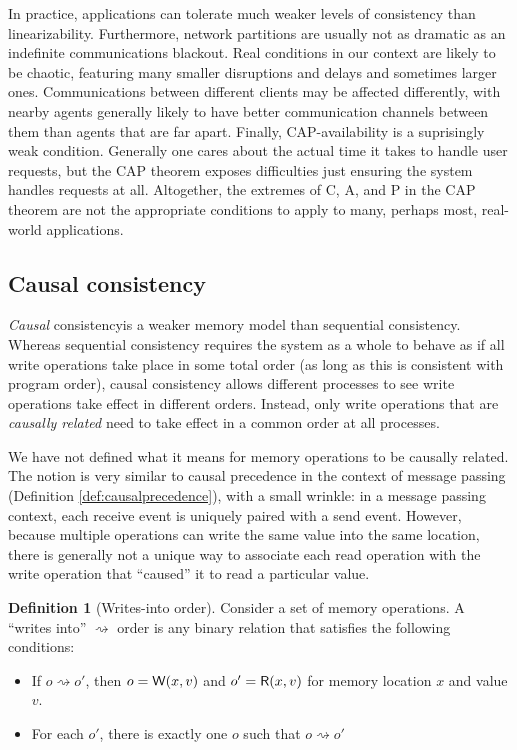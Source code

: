 \documentclass[]             %
{NASA}                       %
\theoremstyle{definition}
\newtheorem{definition}{Definition}[section]
\begin{document}
In practice, applications can tolerate much weaker levels of
consistency than linearizability. Furthermore, network partitions are
usually not as dramatic as an indefinite communications blackout. Real
conditions in our context are likely to be chaotic, featuring many
smaller disruptions and delays and sometimes larger
ones. Communications between different clients may be affected
differently, with nearby agents generally likely to have better
communication channels between them than agents that are far
apart. Finally, CAP-availability is a suprisingly weak condition.
Generally one cares about the actual time it takes to handle user
requests, but the CAP theorem exposes difficulties just ensuring the
system handles requests at all. Altogether, the extremes of C, A, and
P in the CAP theorem are not the appropriate conditions to apply to
many, perhaps most, real-world applications.

\subsection{Causal consistency}
\label{ssec:causal-consistency}

\emph{Causal} consistency\citationneeded is a weaker memory model than
sequential consistency. Whereas sequential consistency requires the
system as a whole to behave as if all write operations take place in
some total order (as long as this is consistent with program order),
causal consistency allows different processes to see write operations
take effect in different orders. Instead, only write operations that
are \emph{causally related} need to take effect in a common order
at all processes.

We have not defined what it means for memory operations to be causally
related. The notion is very similar to causal precedence in the
context of message passing (Definition \ref{def:causalprecedence}),
with a small wrinkle: in a message passing context, each receive event
is uniquely paired with a send event. However, because multiple
operations can write the same value into the same location, there is
generally not a unique way to associate each read operation with the
write operation that ``caused'' it to read a particular value.

\begin{definition}[Writes-into order]
  Consider a set of memory operations. A ``writes into''
  $\rightsquigarrow$ order is any binary relation that satisfies the
  following conditions:
  \begin{itemize}
  \item If $o \rightsquigarrow o'$, then $o = \mathsf{W}\!\left(x, v\right)$ and $o' = \mathsf{R}\!\left(x, v\right)$ for memory location $x$ and value $v$.
  \item For each $o'$, there is exactly one $o$ such that $o \rightsquigarrow o'$
  \end{itemize}
\end{definition}
\end{document}
